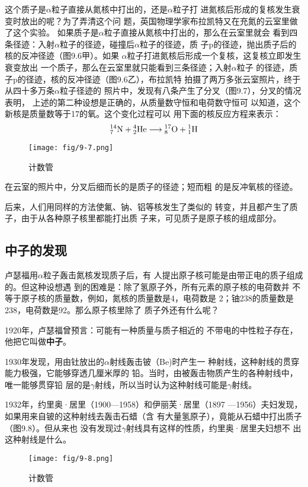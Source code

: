 这个质子是$\alpha$粒子直接从氮核中打出的，还是$\alpha$粒子打
进氮核后形成的复核发生衰变时放出的呢？为了弄清这个问
题，英国物理学家布拉凯特又在充氮的云室里做了这个实验。
如果质子是$\alpha$粒子直接从氮核中打出的，那么在云室里就会
看到四条径迹：入射$\alpha$粒子的径迹，碰撞后$\alpha$粒子的径迹，质
子p的径迹，抛出质子后的核的反冲径迹（图9.6甲）。如果
$\alpha$粒子打进氮核后形成一个复核，这复核立即发生衰变放出
一个质子，那么在云室里就只能看到三条径迹；入射$\alpha$粒子
的径迹，质子p的径迹，核的反冲径迹（图9.6乙），布拉凯特
拍摄了两万多张云室照片，终于从四十多万条$\alpha$粒子径迹的
照片中，发现有八条产生了分叉（图9.7），分叉的情况表明，
上述的第二种设想是正确的，从质量数守恒和电荷数守恒可
以知道，这个新核是质量数等于17的氧。这个变化过程可以
用下面的核反应方程来表示：
\[\atom{N}{14}{7}+\atom{He}{4}{2}\longrightarrow \atom{O}{17}{8}+\atom{H}{1}{1} \]
\begin{figure}[htp]\centering
\texttt{[image: fig/9-7.png]}
\caption{计数管}
\end{figure}

在云室的照片中，分叉后细而长的是质子的径迹；短而粗
的是反冲氧核的径迹。

后来，人们用同样的方法使氟、钠、铝等核发生了类似的
转变，并且都产生了质子，由于从各种原子核里都能打出质
子来，可见质子是原子核的组成部分。

\subsection{中子的发现}

卢瑟福用$\alpha$粒子轰击氮核发现质子后，有
人提出原子核可能是由带正电的质子组成的。但这种设想遇
到的困难是：除了氢原子外，所有元素的原子核的电荷数并
不等于原子核的质量数，例如，氮核的质量数是4，电荷数是
2；铀238的质量数是238，电荷数是92。那么原子核里除了
质子外还有什么呢？

1920年，卢瑟福曾预言：可能有一种质量与质子相近的
不带电的中性粒子存在，他把它叫做\textbf{中子}。

1930年发现，用由钍放出的$\alpha$射线轰击铍（Be)时产生一
种射线，这种射线的贯穿能力极强，它能够穿透几厘米厚的
铅。当时，由被轰击物质产生的各种射线中，唯一能够贯穿铅
层的是$\gamma$射线，所以当时认为这种射线可能是$\gamma$射线。

1932年，约里奥·居里（1900—1958）和伊丽芙·居里（1897
—1956）夫妇发现，如果用来自铍的这种射线去轰击石蜡（含
有大量氢原子），竟能从石蜡中打出质子（图9.8）。但从来也
没有发现过$\gamma$射线具有这样的性质，约里奥·居里夫妇想不
出这种射线是什么。
\begin{figure}[htp]\centering
\texttt{[image: fig/9-8.png]}
\caption{计数管}
\end{figure}

